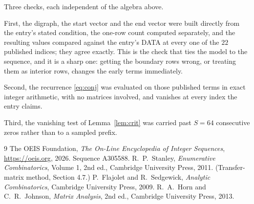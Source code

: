 \documentclass[11pt,a4paper]{article}
\theoremstyle{plain}
\theoremstyle{definition}
\begin{document}
Three checks, each independent of the algebra above.

First, the digraph, the start vector and the end vector were built directly from the
entry's stated condition, the one-row count computed separately, and the resulting values
compared against the entry's DATA at every one of the $22$ published indices; they
agree exactly. This is the check that ties the model to the sequence, and it is a sharp one:
getting the boundary rows wrong, or treating them as interior rows, changes the early terms
immediately.

Second, the recurrence \eqref{eq:conj} was evaluated on those published terms in exact
integer arithmetic, with no matrices involved, and vanishes at every index the entry claims.

Third, the vanishing test of Lemma~\ref{lem:crit} was carried past $S=64$ consecutive
zeros rather than to a sampled prefix.

\begin{thebibliography}{9}
 The OEIS Foundation, \emph{The On-Line Encyclopedia of Integer
Sequences}, \url{https://oeis.org}, 2026. Sequence A305588.
 R.~P.~Stanley, \emph{Enumerative Combinatorics}, Volume 1, 2nd ed.,
Cambridge University Press, 2011. (Transfer-matrix method, Section 4.7.)
 P.~Flajolet and R.~Sedgewick, \emph{Analytic Combinatorics}, Cambridge
University Press, 2009.
 R.~A.~Horn and C.~R.~Johnson, \emph{Matrix Analysis}, 2nd ed., Cambridge
University Press, 2013.
\end{thebibliography}
\end{document}
